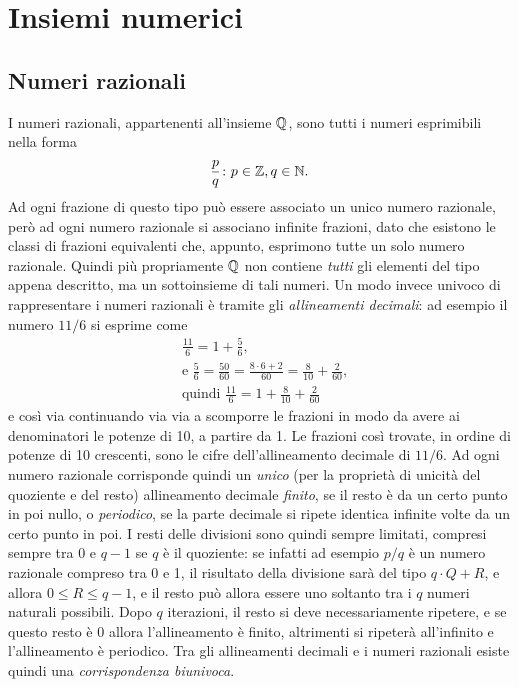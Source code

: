 \chapter{Insiemi numerici}
\section{Numeri razionali}
I numeri razionali, appartenenti all'insieme $\mathbb{Q}$, sono tutti i numeri esprimibili nella forma
\[
\frac{p}{q}\colon p\in\mathbb{Z},q\in\mathbb{N}.
\]
Ad ogni frazione di questo tipo può essere associato un unico numero razionale, però ad ogni numero razionale si associano infinite frazioni, dato che esistono le classi di frazioni equivalenti che, appunto, esprimono tutte un solo numero razionale. Quindi più propriamente $\mathbb{Q}$ non contiene \emph{tutti} gli elementi del tipo appena descritto, ma un sottoinsieme di tali numeri.
Un modo invece univoco di rappresentare i numeri razionali è tramite gli \emph{allineamenti decimali}: ad esempio il numero $11/6$ si esprime come
\begin{align*}
&\frac{11}6=1+\frac56,\\
&\text{e }\frac56=\frac{50}{60}=\frac{8\cdot6+2}{60}=\frac8{10}+\frac2{60},\\
&\text{quindi }\frac{11}6=1+\frac8{10}+\frac2{60}
\end{align*}
e così via continuando via via a scomporre le frazioni in modo da avere ai denominatori le potenze di 10, a partire da 1. Le frazioni così trovate, in ordine di potenze di 10 crescenti, sono le cifre dell'allineamento decimale di $11/6$.
Ad ogni numero razionale corrisponde quindi un \emph{unico} (per la proprietà di unicità del quoziente e del resto) allineamento decimale \emph{finito}, se il resto è da un certo punto in poi nullo, o \emph{periodico}, se la parte decimale si ripete identica infinite volte da un certo punto in poi.
I resti delle divisioni sono quindi sempre limitati, compresi sempre tra 0 e $q-1$ se $q$ è il quoziente: se infatti ad esempio $p/q$ è un numero razionale compreso tra 0 e 1, il risultato della divisione sarà del tipo $q\cdot Q+R$, e allora $0\leq R\leq q-1$, e il resto può allora essere uno soltanto tra i $q$ numeri naturali possibili. Dopo $q$ iterazioni, il resto si deve necessariamente ripetere, e se questo resto è 0 allora l'allineamento è finito, altrimenti si ripeterà all'infinito e l'allineamento è periodico.
Tra gli allineamenti decimali e i numeri razionali esiste quindi una \emph{corrispondenza biunivoca}.

